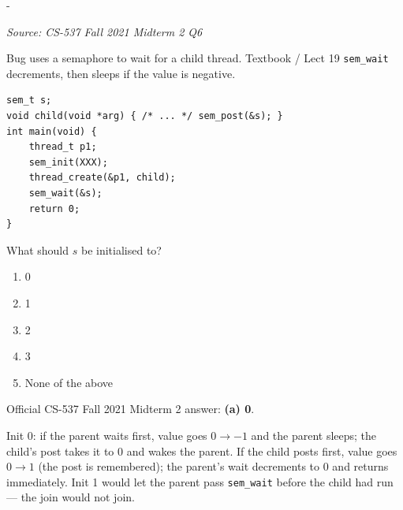 \documentclass[11pt,a4paper]{article}
\makeatletter
\newcommand{\keepspace}[1]{\par\penalty-100\begingroup
  \setlength{\dimen@}{#1}\dimen@ii\pagegoal\advance\dimen@ii-\pagetotal
  \ifdim\dimen@>\dimen@ii\ifdim\dimen@ii>\z@\vfil\fi\break\fi\endgroup}
\newcounter{qn}[section]
\newenvironment{Qn}[4]{%
  \refstepcounter{qn}\keepspace{7\baselineskip}%
  \begin{tcolorbox}[qboxstyle, title={Q\thesection.\theqn\ \ [#1 \textbar\ #2]\ \ #4}]%
  {\footnotesize\color{g3}\textit{Source: #3}}\par\smallskip%
}{%
  \end{tcolorbox}%
}
\newenvironment{Sol}{%
  \begin{tcolorbox}[sboxstyle, title={Solution}]%
}{%
  \end{tcolorbox}\vspace{0.35em}%
}
\makeatother
\begin{document}
\begin{Qn}{Easy-Medium}{Lect 19}{CS-537 Fall 2021 Midterm 2 Q6}{Join with one child: what initial value?}
Bug uses a semaphore to wait for a child thread. Textbook / Lect 19
\texttt{sem\_wait} decrements, then sleeps if the value is negative.
\begin{lstlisting}[numbers=none]
sem_t s;
void child(void *arg) { /* ... */ sem_post(&s); }
int main(void) {
    thread_t p1;
    sem_init(XXX);
    thread_create(&p1, child);
    sem_wait(&s);
    return 0;
}
\end{lstlisting}
What should $s$ be initialised to?
\begin{enumerate}
  \item[(a)] 0
  \item[(b)] 1
  \item[(c)] 2
  \item[(d)] 3
  \item[(e)] None of the above
\end{enumerate}
\end{Qn}
\begin{Sol}
Official CS-537 Fall 2021 Midterm 2 answer: \textbf{(a) 0}.

Init 0: if the parent waits first, value goes $0\to -1$ and the parent
sleeps; the child's post takes it to 0 and wakes the parent. If the
child posts first, value goes $0\to 1$ (the post is remembered); the
parent's wait decrements to 0 and returns immediately. Init 1 would let
the parent pass \texttt{sem\_wait} before the child had run --- the
join would not join.
\end{Sol}
\end{document}
